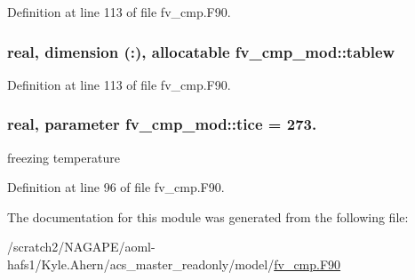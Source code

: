 Definition at line 113 of file fv\-\_\-cmp.\-F90.

\subsubsection[{tablew}]{\setlength{\rightskip}{0pt plus 5cm}real, dimension (\-:), allocatable fv\-\_\-cmp\-\_\-mod\-::tablew\hspace{0.3cm}{\ttfamily [private]}}\label{classfv__cmp__mod_a308d1b16faf8b0f7c53fb4ace71f326e}


Definition at line 113 of file fv\-\_\-cmp.\-F90.

\subsubsection[{tice}]{\setlength{\rightskip}{0pt plus 5cm}real, parameter fv\-\_\-cmp\-\_\-mod\-::tice = 273.\hspace{0.3cm}{\ttfamily [private]}}\label{classfv__cmp__mod_a7ad671e67cd91ec927c0392e32bf5d7e}


freezing temperature 



Definition at line 96 of file fv\-\_\-cmp.\-F90.



The documentation for this module was generated from the following file\-:\begin{DoxyCompactItemize}
\item 
/scratch2/\-N\-A\-G\-A\-P\-E/aoml-\/hafs1/\-Kyle.\-Ahern/acs\-\_\-master\-\_\-readonly/model/\hyperlink{fv__cmp_8F90}{fv\-\_\-cmp.\-F90}\end{DoxyCompactItemize}
